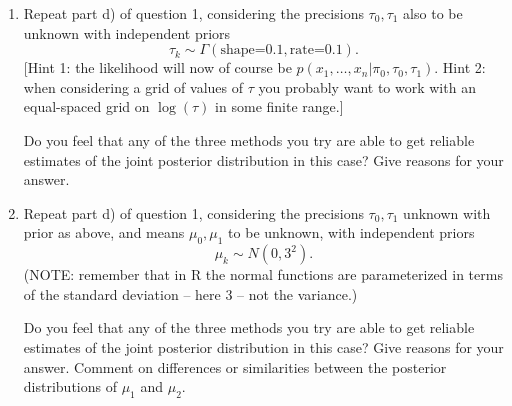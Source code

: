 \documentclass[12pt]{article}
\begin{document}
\begin{enumerate}
\item Repeat part d) of question 1, considering the precisions $\tau_0,\tau_1$ also to be unknown with independent priors
\begin{equation}
\tau_k \sim \Gamma(\text{shape=0.1},\text{rate=0.1}).
\end{equation}
[Hint 1: the likelihood will now of course be $p(x_1,\dots,x_n | \pi_0,\tau_0,\tau_1)$. 
Hint 2: when considering a grid of values of $\tau$ you probably want to work with an equal-spaced grid on $\log(\tau)$ in some finite range.]

Do you feel that any of the three methods you try are able to get reliable estimates of the joint posterior distribution in this case? Give reasons
for your answer.

\item Repeat part d) of question 1, considering the precisions $\tau_0,\tau_1$ unknown with prior as above, and means $\mu_0,\mu_1$ to be unknown, with 
independent priors
\begin{equation}
\mu_k \sim N(0,3^2).
\end{equation}
(NOTE: remember that in R the normal functions are parameterized in terms of the standard deviation -- here 3 -- not the variance.)

Do you feel that any of the three methods you try  are able to get reliable estimates of the joint posterior distribution in this case? Give reasons
for your answer.  Comment on differences or similarities between the posterior distributions of $\mu_1$ and $\mu_2$.
 
\end{enumerate}
\end{document}
